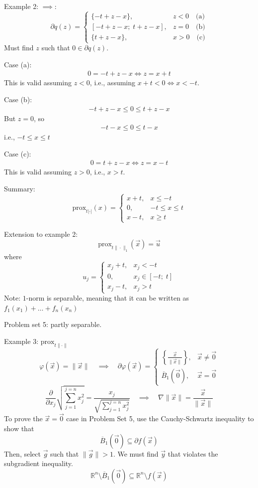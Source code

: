 \documentclass{article}
\newcommand{\R}{\mathbb{R}}             %
\newcommand{\x}{\vec{x}}                %
\newcommand{\y}{\vec{y}}                %
\begin{document}
Example 2:
$\implies$:
\[
    \partial q(z) = \begin{cases}
        \{-t + z - x\}, & z < 0 \quad \text{(a)} \\
        [-t + z - x;\; t + z - x], & z = 0 \quad \text{(b)} \\
        \{t + z - x\}, & x > 0 \quad \text{(c)}
    \end{cases}
\]
Must find $z$ such that $0 \in \partial q(z)$.

Case (a):
\begin{align*}
    0 = -t + z - x \iff z = x + t
\end{align*}
This is valid assuming $z < 0$, i.e., assuming $x + t < 0 \iff x < -t$.

Case (b):
\begin{align*}
    -t + z - x \leq 0 \leq t + z - x
\end{align*}
But $z = 0$, so
\begin{align*}
    -t - x \leq 0 \leq t - x
\end{align*}
i.e., $-t \leq x \leq t$

Case (c):
\begin{align*}
    0 = t + z - x \iff z = x - t
\end{align*}
This is valid assuming $z > 0$, i.e., $x > t$.

Summary:
\[
    \text{prox}_{t | \cdot |}(x) = \begin{cases}
        x + t, & x \leq -t \\
        0, & -t \leq x \leq t \\
        x - t, & x \geq t
    \end{cases}
\]

Extension to example 2:
\[
    \text{prox}_{t \|\cdot\|_1}(\x) = \vec{u}
\]
where
\[
    u_j = \begin{cases}
        x_j + t, & x_j < -t \\
        0, & x_j \in [-t;\; t] \\
        x_j - t, & x_j > t
    \end{cases}
\]
Note: $1$-norm is separable, meaning that it can be written as $f_1(x_1) + \ldots + f_n(x_n)$

Problem set 5: partly separable.

Example 3: $\text{prox}_{t \|\cdot\|}$
\[
    \varphi(\x) = \|\x\| \quad \implies \quad \partial \varphi(\x) = \begin{cases}
        \left\{\frac{\x}{\|\x\|}\right\}, & \x \neq \vec{0} \\
        \overline{B}_1\left(\vec{0}\right), & \x = \vec{0}
    \end{cases}
\]
\[
    \frac{\partial}{\partial x_j} \sqrt{\sum_{j = 1}^{j = n} x_j^2} = \frac{x_j}{\sqrt{\sum_{j = 1}^{j = n} x_j^2}} \quad \implies \quad \nabla \|\x\| = \frac{\x}{\|\x\|}
\]
To prove the $\x = \vec{0}$ case in Problem Set 5, use the Cauchy-Schwartz inequality to show that
\[
    \overline{B}_1\left(\vec{0}\right) \subseteq \partial f(\x)
\]
Then, select $\vec{g}$ such that $\|\vec{g}\| > 1$. We must find $\y$ that violates the subgradient inequality.
\[
    \R^n \setminus \overline{B}_1\left(\vec{0}\right) \subseteq \R^n \setminus f(\x)
\]
\end{document}
